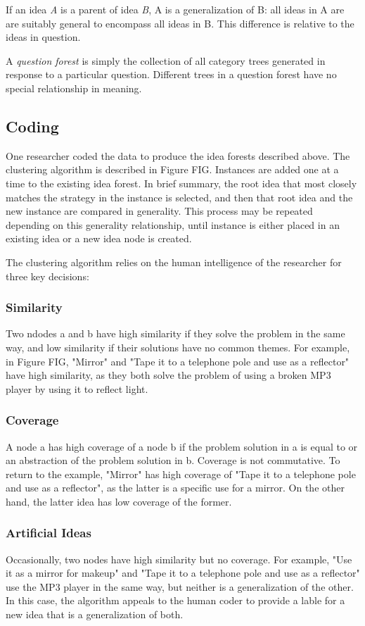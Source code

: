 If an idea \emph{A} is a parent of idea \emph{B}, A is a generalization of B: all ideas in A are are suitably general to encompass all ideas in B. This difference is relative to the ideas in question.

A \emph{question forest} is simply the collection of all category trees generated in response to a particular question. Different trees in a question forest have no special relationship in meaning.

\subsection{Coding}

One researcher coded the data to produce the idea forests described above. The clustering algorithm is described in Figure FIG. Instances are added one at a time to the existing idea forest. In brief summary, the root idea that most closely matches the strategy in the instance is selected, and then that root idea and the new instance are compared in generality. This process may be repeated depending on this generality relationship, until instance is either placed in an existing idea or a new idea node is created.

The clustering algorithm relies on the human intelligence of the researcher for three key decisions:

\subsubsection{Similarity}
Two ndodes a and b have high similarity if they solve the problem in the same way, and low similarity if their solutions have no common themes. For example, in Figure FIG, "Mirror" and "Tape it to a telephone pole and use as a reflector" have high similarity, as they both solve the problem of using a broken MP3 player by using it to reflect light.

\subsubsection{Coverage}
A node a has high coverage of a node b if the problem solution in a is equal to or an abstraction of the problem solution in b. Coverage is not commutative. To return to the example, "Mirror" has high coverage of "Tape it to a telephone pole and use as a reflector", as the latter is a specific use for a mirror. On the other hand, the latter idea has low coverage of the former.

\subsubsection{Artificial Ideas}
Occasionally, two nodes have high similarity but no coverage. For example, "Use it as a mirror for makeup" and "Tape it to a telephone pole and use as a reflector" use the MP3 player in the same way, but neither is a generalization of the other. In this case, the algorithm appeals to the human coder to provide a lable for a new idea that is a generalization of both.

